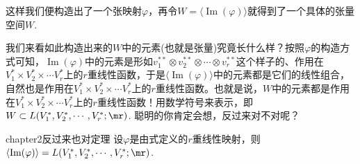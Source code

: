 这样我们便构造出了一个张映射$\varphi$，再令$W=\langle\operatorname{Im}(\varphi) \rangle$就得到了一个具体的张量空间$W$.

 我们来看如此构造出来的$W$中的元素(也就是张量)究竟长什么样？按照$\varphi$的构造方式可知，$\operatorname{Im}(\varphi) $中的元素是形如$v^{\ast\ast}_{1}\otimes v^{\ast\ast}_{2}\otimes\cdots\otimes v^{\ast\ast}_{r}$这个样子的、作用在$V^{\ast}_{1}\times V^{\ast}_{2}\times\cdots V^{\ast}_{r}$上的$r$重线性函数，于是$\langle\operatorname{Im}(\varphi) \rangle$中的元素都是它们的线性组合，自然也是作用在$V^{\ast}_{1}\times V^{\ast}_{2}\times\cdots V^{\ast}_{r}$上的$r$重线性函数。也就是说，$W$中的元素都是作用在$V^{\ast}_{1}\times V^{\ast}_{2}\times\cdots V^{\ast}_{r}$上的$r$重线性函数！用数学符号来表示，即$W\subset L(V^{\ast}_{1}, V^{\ast}_{2},\cdots ,V^{\ast}_{r};\mr)$. 聪明的你肯定会想，反过来对不对呢？
 \begin{mythm}{}{chapter2反过来也对定理}
 	设$\varphi$是由式定义的$r$重线性映射，则$\langle\operatorname{Im}(\varphi) \rangle=L(V^{\ast}_{1}, V^{\ast}_{2},\cdots ,V^{\ast}_{r};\mr)$.
 \end{mythm}
